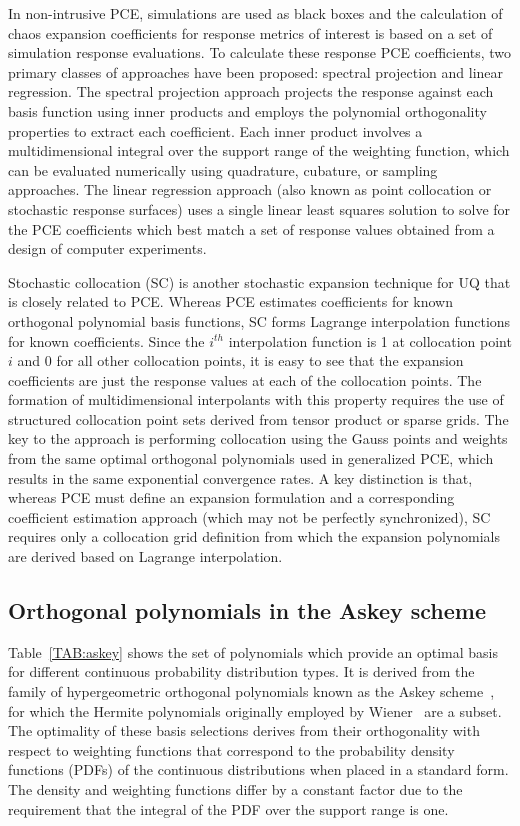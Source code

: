 In non-intrusive PCE, simulations are used as black boxes and the
calculation of chaos expansion coefficients for response metrics of
interest is based on a set of simulation response evaluations.  To
calculate these response PCE coefficients, two primary classes of
approaches have been proposed: spectral projection and linear
regression.  The spectral projection approach projects the response
against each basis function using inner products and employs the
polynomial orthogonality properties to extract each coefficient.  Each
inner product involves a multidimensional integral over the support
range of the weighting function, which can be evaluated numerically
using quadrature, cubature, or sampling approaches.  The linear
regression approach (also known as point collocation or stochastic
response surfaces) uses a single linear least squares solution to
solve for the PCE coefficients which best match a set of response
values obtained from a design of computer experiments.

Stochastic collocation (SC) is another stochastic expansion technique
for UQ that is closely related to PCE.  Whereas PCE estimates
coefficients for known orthogonal polynomial basis functions, SC forms
Lagrange interpolation functions for known coefficients.  Since the
$i^{th}$ interpolation function is 1 at collocation point $i$ and 0
for all other collocation points, it is easy to see that the expansion
coefficients are just the response values at each of the collocation
points.  The formation of multidimensional interpolants with this
property requires the use of structured collocation point sets derived
from tensor product or sparse grids.  The key to the approach is
performing collocation using the Gauss points and weights from the
same optimal orthogonal polynomials used in generalized PCE, which
results in the same exponential convergence rates.  A key distinction
is that, whereas PCE must define an expansion formulation and a
corresponding coefficient estimation approach (which may not be
perfectly synchronized), SC requires only a collocation grid
definition from which the expansion polynomials are derived based on
Lagrange interpolation.

\subsection{Orthogonal polynomials in the Askey scheme} \label{uq:expansion:askey}

Table~\ref{TAB:askey} shows the set of polynomials which provide an
optimal basis for different continuous probability distribution types.
It is derived from the family of hypergeometric orthogonal polynomials
known as the Askey scheme~\cite{askey}, for which the Hermite
polynomials originally employed by Wiener~\cite{wiener} are a subset.
The optimality of these basis selections derives from their
orthogonality with respect to weighting functions that correspond to
the probability density functions (PDFs) of the continuous
distributions when placed in a standard form.  The density and
weighting functions differ by a constant factor due to the requirement
that the integral of the PDF over the support range is one.

